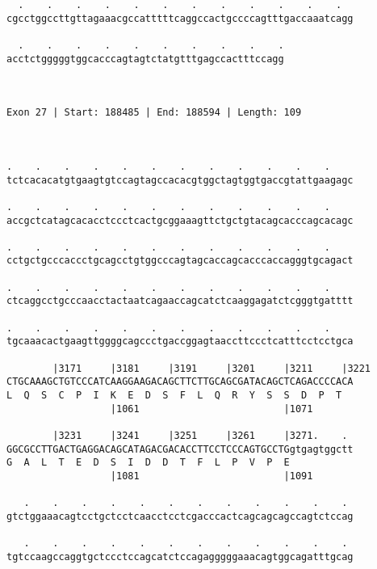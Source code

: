 \documentclass{article}
\begin{document}
\begin{Verbatim}
  .    .    .    .    .    .    .    .    .    .    .    .  
cgcctggccttgttagaaacgccatttttcaggccactgccccagtttgaccaaatcagg
                                                            
  .    .    .    .    .    .    .    .    .    .
acctctgggggtggcacccagtagtctatgtttgagccactttccagg
                                                
                                                
 
Exon 27 | Start: 188485 | End: 188594 | Length: 109



.    .    .    .    .    .    .    .    .    .    .    .    
tctcacacatgtgaagtgtccagtagccacacgtggctagtggtgaccgtattgaagagc
                                                            
.    .    .    .    .    .    .    .    .    .    .    .    
accgctcatagcacacctccctcactgcggaaagttctgctgtacagcacccagcacagc
                                                            
.    .    .    .    .    .    .    .    .    .    .    .    
cctgctgcccaccctgcagcctgtggcccagtagcaccagcacccaccagggtgcagact
                                                            
.    .    .    .    .    .    .    .    .    .    .    .    
ctcaggcctgcccaacctactaatcagaaccagcatctcaaggagatctcgggtgatttt
                                                            
.    .    .    .    .    .    .    .    .    .    .    .    
tgcaaacactgaagttggggcagccctgaccggagtaaccttccctcatttcctcctgca
                                                            
        |3171     |3181     |3191     |3201     |3211     |3221
CTGCAAAGCTGTCCCATCAAGGAAGACAGCTTCTTGCAGCGATACAGCTCAGACCCCACA
L  Q  S  C  P  I  K  E  D  S  F  L  Q  R  Y  S  S  D  P  T  
                  |1061                         |1071       
  
        |3231     |3241     |3251     |3261     |3271.    . 
GGCGCCTTGACTGAGGACAGCATAGACGACACCTTCCTCCCAGTGCCTGgtgagtggctt
G  A  L  T  E  D  S  I  D  D  T  F  L  P  V  P  E           
                  |1081                         |1091       
  
   .    .    .    .    .    .    .    .    .    .    .    . 
gtctggaaacagtcctgctcctcaacctcctcgacccactcagcagcagccagtctccag
                                                            
   .    .    .    .    .    .    .    .    .    .    .    . 
tgtccaagccaggtgctccctccagcatctccagagggggaaacagtggcagatttgcag
                                                            

\end{Verbatim}
\end{document}
